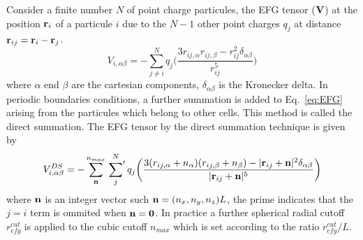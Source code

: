 \documentclass[a4paper,8pt]{article}
\def\nn{{\bf n}}
\def\rr{{\bf r}}
\def\00{{\bf 0}}
\begin{document}
Consider a finite number $N$ of point charge particules, the EFG tensor
($\bf{V}$) at the position $\rr_i$ of a particule $i$ due to the
$N-1$ other point charges $q_j$ at distance $\rr_{ij}=\rr_i-\rr_j$.
\begin{equation}
V_{i,\alpha\beta} = - \sum_{j\ne i}^N q_j \bigg( \frac {3 r_{ij,\alpha} r_{ij,\beta} - r_{ij}^2\delta_{\alpha\beta} } {r_{ij}^5} \bigg )
\label{eq:EFG}
\end{equation}
where  $\alpha$ end $\beta$ are the cartesian components, $\delta_{\alpha\beta}$
is the Kronecker delta.
In periodic boundaries conditions, a further summation is added to
Eq.~\ref{eq:EFG} arising from the particules which belong to other cells.
This method is called the direct summation. The EFG tensor by the direct
summation technique is given by
\begin{equation}
V^{DS}_{i,\alpha\beta} = - \sum_\nn^{n_{max}} \sideset{}{'}\sum^{N}_j \\ q_j\bigg(\frac{3 (r_{ij,\alpha}+n_\alpha) (r_{ij,\beta}+n_\beta) - |\rr_{ij}+\nn|^2\delta_{\alpha\beta} } { |\rr_{ij}+\nn|^5 } \bigg )
\end{equation}
where $\nn$ is an integer vector such $\nn=(n_x,n_y,n_z)L$, the prime indicates
that the $j=i$ term is ommited when $\nn=\00$. In practice a further spherical
radial cutoff $r^{cut}_{efg}$ is applied to the cubic cutoff $n_{max}$ which is set
according to the ratio $r^{cut}_{efg}/L$.

\end{document}
